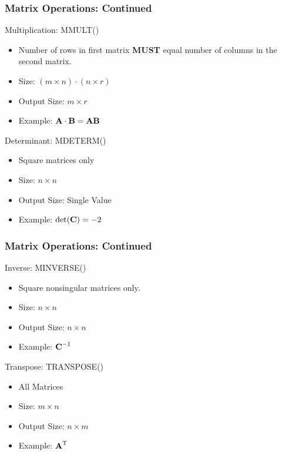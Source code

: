 \documentclass[12pt]{beamer}
\begin{document}
	\begin{frame}
		\frametitle{Matrix Operations: Continued}
		Multiplication: MMULT()
		\begin{itemize}
			\item  Number of rows in first matrix \textbf{MUST} equal number of columns in the second matrix.
			\item Size: $(m\times n) \cdot (n \times r) $
			\item Output Size: $ m \times r $
			\item Example:  $\textbf{\text{A}} \cdot \textbf{\text{B}} = \textbf{\text{AB}}$ 
		\end{itemize}
		Determinant:  MDETERM() 
		\begin{itemize}
			\item Square matrices only
			\item Size: $n \times n $
			\item Output Size: Single Value
			\item Example: $\text{det}(\textbf{\textbf{C}}) = -2 $
		\end{itemize}
	\end{frame}
	\begin{frame}
		\frametitle{Matrix Operations: Continued}
		 Inverse: MINVERSE()
		 \begin{itemize}
		 	\item Square nonsingular matrices only.
		 	\item Size: $n \times n $
		 	\item Output Size:  $n \times n $
		 	\item Example: $\textbf{\text{C}}^{-1}$
		 \end{itemize}
	 	Transpose: TRANSPOSE()
	 	\begin{itemize}
	 		\item All Matrices
	 		\item Size: $m \times n$ 
	 		\item Output Size: $n \times m$
	 		\item Example: $\textbf{\text{A}}^{\text{T}}$
	 	\end{itemize}
 	\end{frame}
\end{document}
